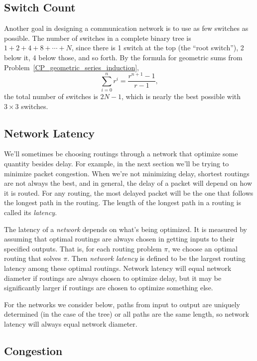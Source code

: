 \subsection{Switch Count}

Another goal in designing a communication network is to use as few
switches as possible.  The number of switches in a complete binary
tree is $1 + 2 + 4 + 8 + \cdots + N$, since there is 1 switch at the
top (the ``root switch''), 2 below it, 4 below those, and so forth.
By the formula for geometric sums from Problem~\ref{CP_geometric_series_induction},
\[
\sum_{i=0}^n r^i = \frac{r^{n+1}-1}{r-1},
\]
the total number of switches is $2 N - 1$, which is nearly the best
possible with $3 \times 3$ switches.

\subsection{Network Latency}

We'll sometimes be choosing routings through a network that optimize some
quantity besides delay.  For example, in the next section we'll be trying
to minimize packet congestion.  When we're not minimizing delay, shortest
routings are not always the best, and in general, the delay of a packet
will depend on how it is routed.  For any routing, the most delayed packet
will be the one that follows the longest path in the routing.  The length
of the longest path in a routing is called its \emph{latency}.


The latency of a \emph{network} depends on what's being optimized.  It is
measured by assuming that optimal routings are always chosen in getting
inputs to their specified outputs.  That is, for each routing problem
$\pi$, we choose an optimal routing that solves $\pi$.  Then \emph{network
  latency} is defined to be the largest routing latency among these
optimal routings.  Network latency will equal network diameter if routings
are always chosen to optimize delay, but it may be significantly larger if
routings are chosen to optimize something else.

For the networks we consider below, paths from input to output are
uniquely determined (in the case of the tree) or all paths are the same
length, so network latency will always equal network diameter.

\subsection{Congestion}

